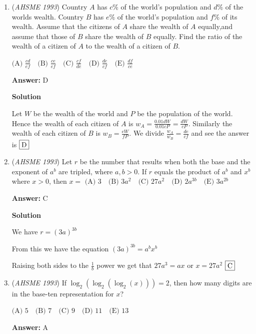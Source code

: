 \begin{enumerate}
 $\fbox{D}$



	\item (\textit{AHSME 1993}) Country $A$ has $c\%$ of the world's population and $d\%$ of the worlds wealth. Country $B$ has $e\%$ of the world's population and $f\%$ of its wealth. Assume that the citizens of $A$ share the wealth of $A$ equally,and assume that those of $B$ share the wealth of $B$ equally. Find the ratio of the wealth of a citizen of $A$ to the wealth of a citizen of $B$.


 $\text{(A) } \frac{cd}{ef}\quad \text{(B) } \frac{ce}{ef}\quad \text{(C) } \frac{cf}{de}\quad \text{(D) } \frac{de}{cf}\quad \text{(E) } \frac{df}{ce}$

 \textbf{Answer: }D



\textbf{Solution}

Let $W$ be the wealth of the world and $P$ be the population of the world.  Hence the wealth of each citizen of $A$ is $w_A = \frac{0.01d W}{0.01cP}=\frac{dW}{cP}$.  Similarly the wealth of each citizen of $B$ is $w_B =\frac{eW}{fP}$.  We divide $\frac{w_A}{w_B} = \frac{de}{cf}$ and see the answer is $\fbox{D}$



	\item (\textit{AHSME 1993}) Let $r$ be the number that results when both the base and the exponent of $a^b$ are tripled, where $a,b>0$. If $r$ equals the product of $a^b$ and $x^b$ where $x>0$, then $x=$
$\text{(A) } 3\quad \text{(B) } 3a^2\quad \text{(C) } 27a^2\quad \text{(D) } 2a^{3b}\quad \text{(E) } 3a^{2b}$

 \textbf{Answer: }C



\textbf{Solution}

We have $r=(3a)^{3b}$

 From this we have the equation $(3a)^{3b}=a^bx^b$

 Raising both sides to the $\frac{1}{b}$ power we get that $27a^3=ax$ or  $x=27a^2$
$\fbox{C}$



	\item (\textit{AHSME 1993}) If $\log_2(\log_2(\log_2(x)))=2$, then how many digits are in the base-ten representation for $x$?


 $\text{(A) } 5\quad \text{(B) } 7\quad \text{(C) } 9\quad \text{(D) } 11\quad \text{(E) } 13$

 \textbf{Answer: }A




\end{enumerate}
